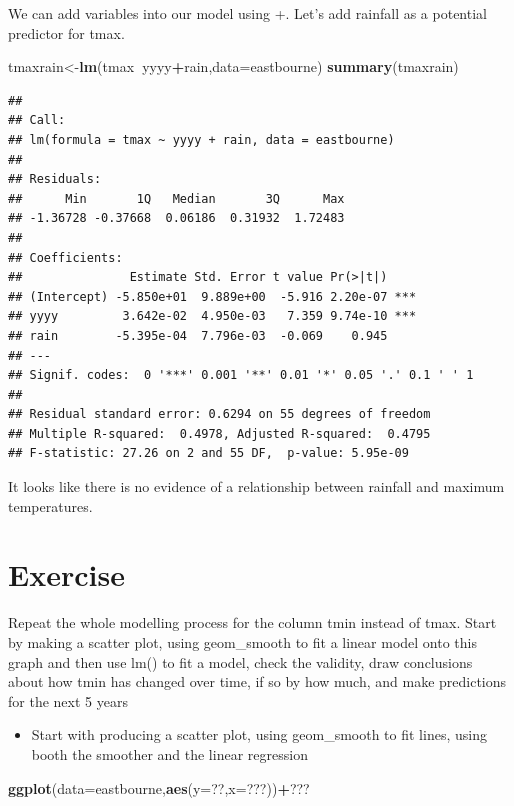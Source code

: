 \documentclass[]{book}
\newenvironment{Shaded}{\begin{snugshade}}{\end{snugshade}}
\newcommand{\DataTypeTok}[1]{\textcolor[rgb]{0.13,0.29,0.53}{#1}}
\newcommand{\KeywordTok}[1]{\textcolor[rgb]{0.13,0.29,0.53}{\textbf{#1}}}
\newcommand{\NormalTok}[1]{#1}
\newcommand{\OperatorTok}[1]{\textcolor[rgb]{0.81,0.36,0.00}{\textbf{#1}}}
\providecommand{\tightlist}{%
  \setlength{\itemsep}{0pt}\setlength{\parskip}{0pt}}
\begin{document}
We can add variables into our model using +. Let's add rainfall as a potential predictor for tmax.

\begin{Shaded}
\begin{Highlighting}[]
\NormalTok{tmaxrain<-}\KeywordTok{lm}\NormalTok{(tmax}\OperatorTok{~}\NormalTok{yyyy}\OperatorTok{+}\NormalTok{rain,}\DataTypeTok{data=}\NormalTok{eastbourne)}
\KeywordTok{summary}\NormalTok{(tmaxrain)}
\end{Highlighting}
\end{Shaded}

\begin{verbatim}
## 
## Call:
## lm(formula = tmax ~ yyyy + rain, data = eastbourne)
## 
## Residuals:
##      Min       1Q   Median       3Q      Max 
## -1.36728 -0.37668  0.06186  0.31932  1.72483 
## 
## Coefficients:
##               Estimate Std. Error t value Pr(>|t|)    
## (Intercept) -5.850e+01  9.889e+00  -5.916 2.20e-07 ***
## yyyy         3.642e-02  4.950e-03   7.359 9.74e-10 ***
## rain        -5.395e-04  7.796e-03  -0.069    0.945    
## ---
## Signif. codes:  0 '***' 0.001 '**' 0.01 '*' 0.05 '.' 0.1 ' ' 1
## 
## Residual standard error: 0.6294 on 55 degrees of freedom
## Multiple R-squared:  0.4978, Adjusted R-squared:  0.4795 
## F-statistic: 27.26 on 2 and 55 DF,  p-value: 5.95e-09
\end{verbatim}

It looks like there is no evidence of a relationship between rainfall and maximum temperatures.

\hypertarget{exercise}{%
\section{Exercise}\label{exercise}}

Repeat the whole modelling process for the column tmin instead of tmax. Start by making a scatter plot, using geom\_smooth to fit a linear model onto this graph and then use lm() to fit a model, check the validity, draw conclusions about how tmin has changed over time, if so by how much, and make predictions for the next 5 years

\begin{itemize}
\tightlist
\item
  Start with producing a scatter plot, using geom\_smooth to fit lines, using booth the smoother and the linear regression
\end{itemize}

\begin{Shaded}
\begin{Highlighting}[]
\KeywordTok{ggplot}\NormalTok{(}\DataTypeTok{data=}\NormalTok{eastbourne,}\KeywordTok{aes}\NormalTok{(}\DataTypeTok{y=}\NormalTok{??,}\DataTypeTok{x=}\NormalTok{???))}\OperatorTok{+}\NormalTok{???}
\end{Highlighting}
\end{Shaded}
\end{document}

